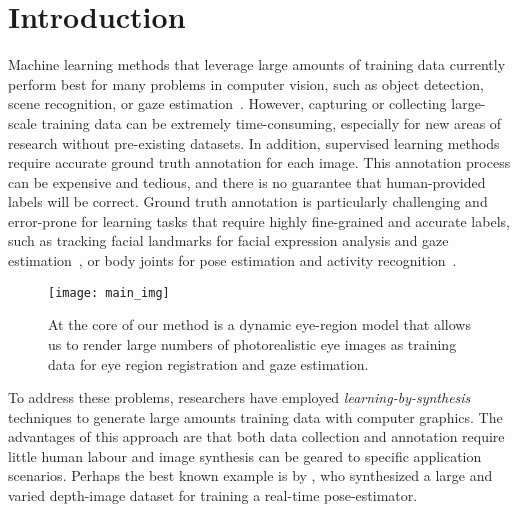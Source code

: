 
\section{Introduction}


Machine learning methods that leverage large amounts of training data currently perform best for many problems in computer vision, such as object detection, scene recognition, or gaze estimation~\cite{zhou2014learning,girshick2014rich,zhang15_cvpr}.
However, capturing or collecting large-scale training data can be extremely time-consuming, especially for new areas of research without pre-existing datasets.
In addition, supervised learning methods require accurate ground truth annotation for each image.
This annotation process can be expensive and tedious, and there is no guarantee that human-provided labels will be correct.
Ground truth annotation is particularly challenging and error-prone for learning tasks that require highly fine-grained and accurate labels, such as tracking facial landmarks for facial expression analysis and gaze estimation~, or body joints for pose estimation and activity recognition~.

\begin{figure}
    \texttt{[image: main\_img]}
    \caption{At the core of our method is a dynamic eye-region model that allows us to render large numbers of photorealistic eye images as training data for eye region registration and gaze estimation.}
    \label{fig:teaser}
\end{figure}

To address these problems, researchers have employed \emph{learning-by-synthesis} techniques to generate large amounts training data with computer graphics.
The advantages of this approach are that both data collection and annotation require little human labour and image synthesis can be geared to specific application scenarios.
Perhaps the best known example is by \citet{shotton2013real}, who synthesized a large and varied depth-image dataset for training a real-time pose-estimator.


